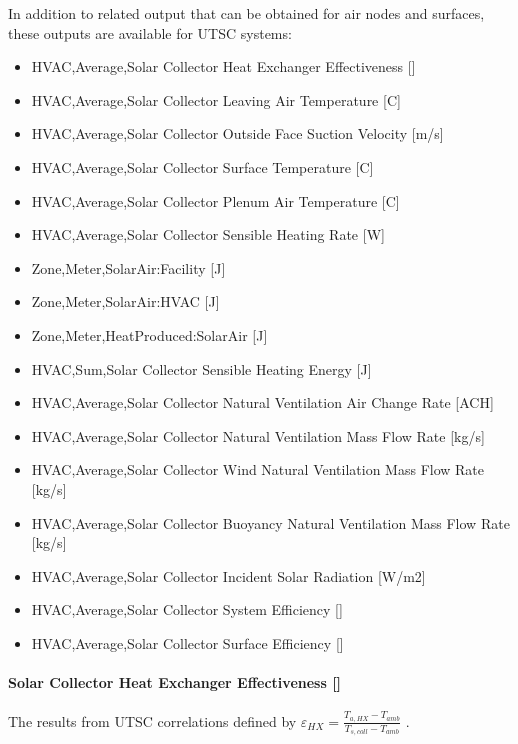 In addition to related output that can be obtained for air nodes and surfaces, these outputs are available for UTSC systems:

\begin{itemize}
\item
  HVAC,Average,Solar Collector Heat Exchanger Effectiveness {[]}
\item
  HVAC,Average,Solar Collector Leaving Air Temperature {[}C{]}
\item
  HVAC,Average,Solar Collector Outside Face Suction Velocity {[}m/s{]}
\item
  HVAC,Average,Solar Collector Surface Temperature {[}C{]}
\item
  HVAC,Average,Solar Collector Plenum Air Temperature {[}C{]}
\item
  HVAC,Average,Solar Collector Sensible Heating Rate {[}W{]}
\item
  Zone,Meter,SolarAir:Facility {[}J{]}
\item
  Zone,Meter,SolarAir:HVAC {[}J{]}
\item
  Zone,Meter,HeatProduced:SolarAir {[}J{]}
\item
  HVAC,Sum,Solar Collector Sensible Heating Energy {[}J{]}
\item
  HVAC,Average,Solar Collector Natural Ventilation Air Change Rate {[}ACH{]}
\item
  HVAC,Average,Solar Collector Natural Ventilation Mass Flow Rate {[}kg/s{]}
\item
  HVAC,Average,Solar Collector Wind Natural Ventilation Mass Flow Rate {[}kg/s{]}
\item
  HVAC,Average,Solar Collector Buoyancy Natural Ventilation Mass Flow Rate {[}kg/s{]}
\item
  HVAC,Average,Solar Collector Incident Solar Radiation {[}W/m2{]}
\item
  HVAC,Average,Solar Collector System Efficiency {[]}
\item
  HVAC,Average,Solar Collector Surface Efficiency {[]}
\end{itemize}

\paragraph{Solar Collector Heat Exchanger Effectiveness {[]}}\label{solar-collector-heat-exchanger-effectiveness}

The results from UTSC correlations defined by \({\varepsilon_{HX}} = \frac{{{T_{a,HX}} - {T_{amb}}}}{{{T_{s,coll}} - {T_{amb}}}}\) .

